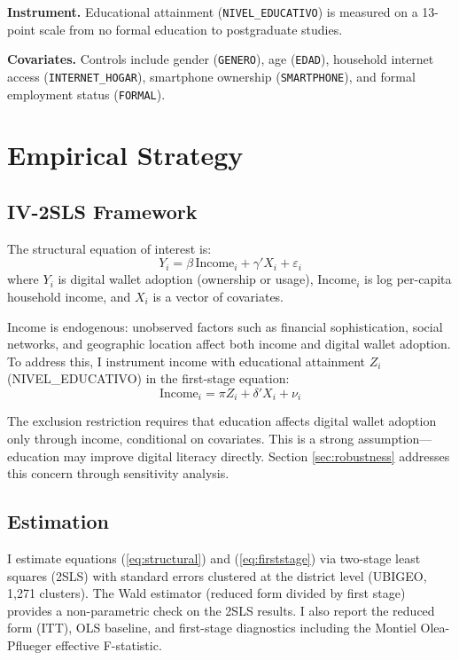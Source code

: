 \documentclass[12pt,a4paper]{article}
\begin{document}
\textbf{Instrument.} Educational attainment (\texttt{NIVEL\_EDUCATIVO}) is
measured on a 13-point scale from no formal education to postgraduate studies.

\textbf{Covariates.} Controls include gender (\texttt{GENERO}), age
(\texttt{EDAD}), household internet access (\texttt{INTERNET\_HOGAR}),
smartphone ownership (\texttt{SMARTPHONE}), and formal employment status
(\texttt{FORMAL}).



\section{Empirical Strategy}
\label{sec:methods}

\subsection{IV-2SLS Framework}

The structural equation of interest is:
\begin{equation}
Y_i = \beta \, \text{Income}_i + \gamma' X_i + \varepsilon_i
\label{eq:structural}
\end{equation}
where $Y_i$ is digital wallet adoption (ownership or usage), $\text{Income}_i$
is log per-capita household income, and $X_i$ is a vector of covariates.

Income is endogenous: unobserved factors such as financial sophistication,
social networks, and geographic location affect both income and digital wallet
adoption. To address this, I instrument income with educational attainment
$Z_i$ (NIVEL\_EDUCATIVO) in the first-stage equation:
\begin{equation}
\text{Income}_i = \pi Z_i + \delta' X_i + \nu_i
\label{eq:firststage}
\end{equation}

The exclusion restriction requires that education affects digital wallet
adoption only through income, conditional on covariates. This is a strong
assumption---education may improve digital literacy directly. Section
\ref{sec:robustness} addresses this concern through sensitivity analysis.

\subsection{Estimation}

I estimate equations (\ref{eq:structural}) and (\ref{eq:firststage}) via
two-stage least squares (2SLS) with standard errors clustered at the district
level (UBIGEO, 1,271 clusters). The Wald estimator (reduced form divided by
first stage) provides a non-parametric check on the 2SLS results. I also
report the reduced form (ITT), OLS baseline, and first-stage diagnostics
including the Montiel Olea-Pflueger effective F-statistic.
\end{document}

